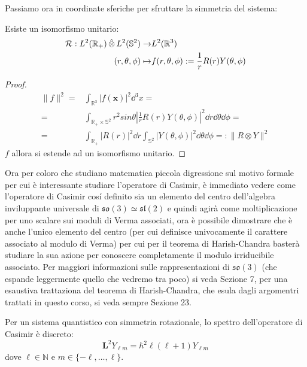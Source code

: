 Passiamo ora in coordinate sferiche per sfruttare la simmetria del sistema:
\begin{lemma}
    Esiste un isomorfismo unitario: 
\begin{align*}
\mathcal{R} :   L^2(\mathbb{R}_+) \operatorname{\hat{\otimes}} L^2(\mathbb{S}^2) \to& L^2(\mathbb{R}^3) \\ 
(r, \theta, \phi) \mapsto& f(r,\theta, \phi) := \dfrac{1}{r}R(r)Y(\theta, \phi)
\end{align*}
\end{lemma}

\begin{proof}
    \begin{align*}
    \|f\|^2=& \int_{\mathbb{R}^3} |f(\mathbf{x})|^2 \dd^3 x = \\
 =& \int_{\mathbb{R}_+ \times \mathbb{S}^2}r^2sin \theta \left| \frac{1}{r}R(r) Y (\theta, \phi)\right|^2 \dd r \dd \theta \dd \phi =\\ 
 =&  \int_{\mathbb{R}_+} |R(r)|^2 \dd r \int_{\mathbb{S}^2} |Y(\theta, \phi)|^2 \dd \theta \dd \phi =: \|R \otimes Y\|^2
    \end{align*}
 $f$ allora si estende ad un isomorfismo unitario. 
\end{proof}


Ora per coloro che studiano matematica piccola digressione sul motivo formale per cui è interessante studiare l'operatore di Casimir, è immediato vedere come l'operatore di Casimir cosí definito sia un elemento del centro dell'algebra inviluppante universale di $\mathfrak{so}(3)\simeq \mathfrak{sl}(2)$ e quindi agirà come moltiplicazione per uno scalare sui moduli di Verma associati, ora è possibile dimostrare che è anche l'unico elemento del centro (per cui definisce univocamente il carattere associato al modulo di Verma) per cui per il teorema di Harish-Chandra basterà studiare la sua azione per conoscere completamente il modulo irriducibile associato. Per maggiori informazioni sulle rappresentazioni di $\mathfrak{so}(3)$ (che espande leggermente quello che vedremo tra poco) si veda \cite{Humphreys} Sezione 7, per una esaustiva trattaziona del teorema di Harish-Chandra, che esula dagli argomentri trattati in questo corso, si veda sempre \cite{Humphreys} Sezione 23. 


Per un sistema quantistico con simmetria rotazionale, lo spettro dell'operatore di Casimir è discreto:
\begin{equation*}
\mathbf{L}^2 Y_{\ell m} = \hbar^2 \ell(\ell+1) Y_{\ell m}
\end{equation*}
dove $\ell \in \mathbb{N}$ e $m \in \{-\ell, \dots, \ell\}$.



